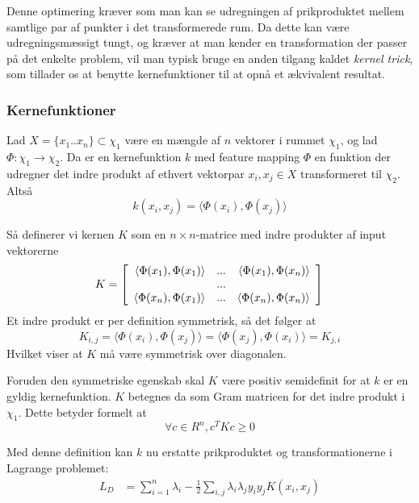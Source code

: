 \documentclass{article}
\begin{document}
Denne optimering kræver som man kan se udregningen af prikproduktet mellem samtlige par af punkter i det transformerede rum. Da dette kan være udregningsmæssigt tungt, og kræver at man kender en transformation der passer på det enkelte problem, vil man typisk bruge en anden tilgang kaldet \textit{kernel trick}, som tillader os at benytte kernefunktioner til at opnå et ækvivalent resultat.


\subsubsection{Kernefunktioner}
Lad $X=\{x_1..x_n\}\subset \chi_1$ være en mængde af $n$ vektorer i rummet $\chi_1$, og lad $\Phi:\chi_1\rightarrow\chi_2$. Da er en kernefunktion $k$ med feature mapping $\Phi$ en funktion der udregner det indre produkt af ethvert vektorpar $x_i,x_j\in X$ transformeret til $\chi_2$. Altså
\begin{equation}
k(x_i,x_j)=\langle\Phi(x_i),\Phi(x_j)\rangle
\end{equation}

Så definerer vi kernen $K$ som en $n\times n$-matrice med indre produkter af input vektorerne
\begin{equation}
K=\left[\begin{array}{r r r}
\langle\Phi(x_1),\Phi(x_1)\rangle & ... & \langle\Phi(x_1),\Phi(x_n)\rangle\\
 & ... & \\
\langle\Phi(x_n),\Phi(x_1)\rangle & ... & \langle\Phi(x_n),\Phi(x_n)\rangle\\
\end{array}\right]\\
\end{equation}
Et indre produkt er per definition symmetrisk, så det følger at
\begin{equation}
K_{i,j}=\langle\Phi(x_i),\Phi(x_j)\rangle=\langle\Phi(x_j),\Phi(x_i)\rangle=K_{j,i}
\end{equation}
Hvilket viser at $K$ må være symmetrisk over diagonalen. 

Foruden den symmetriske egenskab skal $K$ være positiv semidefinit for at $k$ er en gyldig kernefunktion. $K$ betegnes da som Gram matricen for det indre produkt i $\chi_1$. Dette betyder formelt at
\begin{equation}
\forall c\in R^n,c^TKc\geq 0
\end{equation}




Med denne definition kan $k$ nu erstatte prikproduktet og transformationerne i Lagrange problemet:
\begin{align*}
L_D&=\sum_{i=1}^{n}\lambda_i-\frac{1}{2}\sum_{i,j}\lambda_i\lambda_j y_iy_jK(x_i,x_j)
\end{align*}
\end{document}
